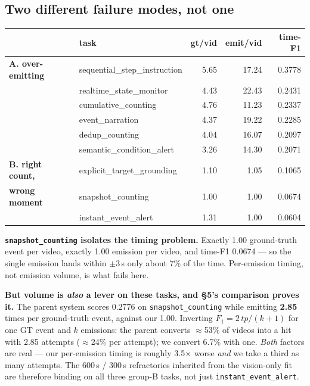 \documentclass[11pt,a4paper]{article}
\newenvironment{keybox}{\begin{shaded}\noindent}{\end{shaded}}
\begin{document}
\subsection{Two different failure modes, not one}

\begin{center}\small
\begin{tabular}{llrrr}
\toprule
& task & gt/vid & emit/vid & time-F1 \\
\midrule
\textbf{A. over-emitting}
& sequential\_step\_instruction & 5.65 & 17.24 & 0.3778 \\
& realtime\_state\_monitor      & 4.43 & 22.43 & 0.2431 \\
& cumulative\_counting          & 4.76 & 11.23 & 0.2337 \\
& event\_narration              & 4.37 & 19.22 & 0.2285 \\
& dedup\_counting               & 4.04 & 16.07 & 0.2097 \\
& semantic\_condition\_alert    & 3.26 & 14.30 & 0.2071 \\
\midrule
\textbf{B. right count,}
& explicit\_target\_grounding   & 1.10 &  1.05 & 0.1065 \\
\textbf{wrong moment}
& snapshot\_counting            & 1.00 &  1.00 & 0.0674 \\
& instant\_event\_alert         & 1.31 &  1.00 & 0.0604 \\
\bottomrule
\end{tabular}
\end{center}

\begin{keybox}
\textbf{\texttt{snapshot\_counting} isolates the timing problem.} Exactly 1.00 ground-truth
event per video, exactly 1.00 emission per video, and time-F1 0.0674 --- so the single
emission lands within $\pm$3\,s only about 7\% of the time. Per-emission timing, not
emission volume, is what fails here.
\end{keybox}

\noindent\textbf{But volume is \emph{also} a lever on these tasks, and \S5's comparison
proves it.} The parent system scores 0.2776 on \texttt{snapshot\_counting} while emitting
\textbf{2.85} times per ground-truth event, against our 1.00. Inverting $F_1 = 2\,tp/(k+1)$
for one GT event and $k$ emissions: the parent converts $\approx$53\% of videos into a hit
with 2.85 attempts ($\approx$24\% per attempt); we convert 6.7\% with one. \emph{Both}
factors are real --- our per-emission timing is roughly 3.5$\times$ worse \emph{and} we take
a third as many attempts. The 600\,s / 300\,s refractories inherited from the vision-only
fit are therefore binding on all three group-B tasks, not just
\texttt{instant\_event\_alert}.
\end{document}
